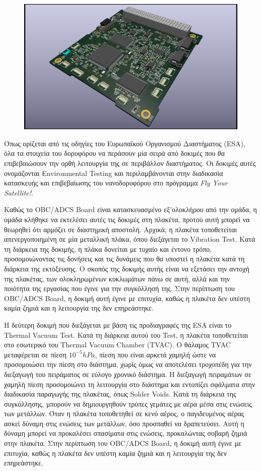 \documentclass[a4paper,nobib,justified]{tufte-book}
\begin{document}
\begin{figure}[ht]
	\includegraphics[width=0.8\linewidth]{media/images/obc-adcs-board.jpg}
\end{figure}

Όπως ορίζεται από τις οδηγίες του Ευρωπαϊκού Οργανισμού Διαστήματος (ESA), όλα τα στοιχεία του δορυφόρου να περάσουν μία σειρά από δοκιμές που θα επιβεβαιώσουν την ορθή λειτουργία της σε περιβάλλον διαστήματος. Οι δοκιμές αυτές ονομάζονται Environmental Testing και περιλαμβάνονται στην διαδικασία κατασκευής και επιβεβαίωσης του νανοδορυφόρου στο πρόγραμμα \textit{Fly Your Satellite!}.

Καθώς το OBC/ADCS Board είναι κατασκευασμένο εξ'ολοκλήρου από την ομάδα, η ομάδα κλήθηκε να εκτελέσει αυτές τις δοκιμές στη πλακέτα, προτού αυτή μπορεί να θεωρηθεί ότι αρμόζει σε διαστημική αποστολή. Αρχικά, η πλακέτα τοποθετείται απενεργοποιημένη σε μία μεταλλική πλάκα, όπου διεξάγεται το Vibration Test. Κατά τη διάρκεια της δοκιμής, η πλάκα δονείται με τυχαίο και έντονο τρόπο, προσομοιώνοντας τις δονήσεις και τις δυνάμεις που θα υποστεί η πλακέτα κατά τη διάρκεια της εκτόξευσης. Ο σκοπός της δοκιμής αυτής είναι να εξετάσει την αντοχή της πλακέτας, των ολοκληρωμένων κυκλωμάτων πάνω σε αυτή, αλλά και την ποιότητα της εργασίας που έγινε για την συγκόλλησή της. Στην περίπτωση του OBC/ADCS Board, η δοκιμή αυτή έγινε με επιτυχία, καθώς η πλακέτα δεν υπέστη καμία ζημιά και η λειτουργία της δεν επηρεάστηκε.

Η δεύτερη δοκιμή που διεξάγεται με βάση τις προδιαγραφές της ESA είναι το Thermal Vacuum Test. Κατά τη διάρκεια αυτού του Test, η πλακέτα τοποθετείται στο εσωτερικό του Thermal Vacuum Chamber (TVAC). Ο θάλαμος TVAC μεταφέρεται σε πίεση $10^{-5} hPa$, πίεση που είναι αρκετά χαμηλή ώστε να προσομοιώσει την πίεση στο διάστημα, χωρίς όμως να αποτελέσει τροχοπέδη για την διεξαγωγή του πειράματος σε εύλογο χρονικό διάστημα. Η διεξαγωγή πειραμάτων σε χαμηλή πίεση προσομοιώνει τη λειτουργία στο διάστημα και εντοπίζει σφάλματα στην διαδικασία παραγωγής της πλακέτας, όπως Solder Voids. Κατά τη διάρκεια της συγκόλλησης, μπορούν να δημιουργηθούν τρύπες γεμάτες με αέρα μέσα στις ενώσεις των μετάλλων. Όταν η πλακέτα τοποθετηθεί σε κενό αέρος, ο παγιδευμένος αέρας ασκεί δύναμη στις ενώσεις των μετάλλων, όσο προσπαθεί να δραπετεύσει. Αυτή η δύναμη μπορεί να προκαλέσει σπασίματα στις ενώσεις, προκαλώντας σοβαρή ζημιά στην πλακέτα. Στην περίπτωση του OBC/ADCS Board, η δοκιμή αυτή έγινε με επιτυχία, καθώς η πλακέτα δεν υπέστη καμία ζημιά και η λειτουργία της δεν επηρεάστηκε.
\end{document}
